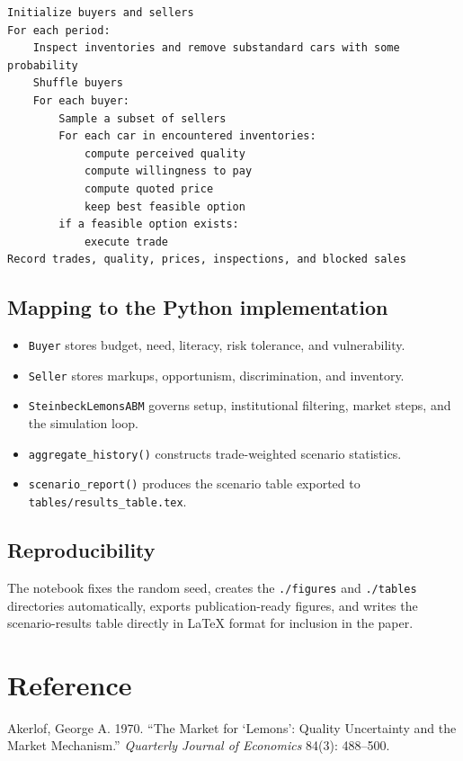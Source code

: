 \documentclass[12pt]{article}
\begin{document}
\begin{verbatim}
Initialize buyers and sellers
For each period:
    Inspect inventories and remove substandard cars with some probability
    Shuffle buyers
    For each buyer:
        Sample a subset of sellers
        For each car in encountered inventories:
            compute perceived quality
            compute willingness to pay
            compute quoted price
            keep best feasible option
        if a feasible option exists:
            execute trade
Record trades, quality, prices, inspections, and blocked sales
\end{verbatim}

\subsection{Mapping to the Python implementation}

\begin{itemize}
    \item \texttt{Buyer} stores budget, need, literacy, risk tolerance, and vulnerability.
    \item \texttt{Seller} stores markups, opportunism, discrimination, and inventory.
    \item \texttt{SteinbeckLemonsABM} governs setup, institutional filtering, market steps, and the simulation loop.
    \item \texttt{aggregate\_history()} constructs trade-weighted scenario statistics.
    \item \texttt{scenario\_report()} produces the scenario table exported to \texttt{tables/results\_table.tex}.
\end{itemize}

\subsection{Reproducibility}

The notebook fixes the random seed, creates the \texttt{./figures} and \texttt{./tables} directories automatically, exports publication-ready figures, and writes the scenario-results table directly in LaTeX format for inclusion in the paper.

\section*{Reference}

Akerlof, George A. 1970. ``The Market for `Lemons': Quality Uncertainty and the Market Mechanism.'' \textit{Quarterly Journal of Economics} 84(3): 488--500.
\end{document}
